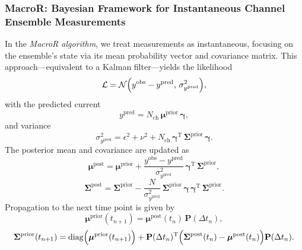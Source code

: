 \documentclass[pdflatex,sn-nature]{sn-jnl}%
\begin{document}
\subsubsection{MacroR: Bayesian Framework for Instantaneous Channel Ensemble Measurements}

In the \textit{MacroR algorithm}, we treat measurements as instantaneous, focusing on the ensemble's state via its mean probability vector and covariance matrix. This approach—equivalent to a Kalman filter\cite{stepanyuk2011efficient}—yields the likelihood
\begin{equation}
\mathcal{L} = \mathcal{N}\Bigl( y^{\text{obs}} - y^{\text{pred}},\, \sigma^2_{y^{\text{pred}}} \Bigr),
\label{eq:macro_likelihood}
\end{equation}
with the predicted current
	\begin{equation}
	y^{\text{pred}} = N_{\text{ch}}\, \boldsymbol{\mu}^{\text{prior}}\, \boldsymbol{\gamma},
\label{eq:macro_predicted_y}
\end{equation}
and variance
\begin{equation}
\sigma^2_{y^{\text{pred}}} = \epsilon^2 + \nu^2+ N_{\text{ch}}\, \boldsymbol{\gamma}^{\mathrm{T}}\, \boldsymbol{\Sigma}^{\text{prior}}\, \boldsymbol{\gamma}.
	\label{eq:macro_sigma_pred}
	\end{equation}
The posterior mean and covariance are updated as
\begin{equation}
\boldsymbol{\mu}^{\text{post}} = \boldsymbol{\mu}^{\text{prior}} + \frac{y^{\text{obs}} - y^{\text{pred}}}{\sigma^2_{y^{\text{pred}}}}\, \boldsymbol{\gamma}^{\mathrm{T}}\, \boldsymbol{\Sigma}^{\text{prior}},
\label{eq:macro_mean_posterior}
\end{equation}
	\begin{equation}
	\boldsymbol{\Sigma}^{\text{post}} = \boldsymbol{\Sigma}^{\text{prior}} - \frac{N}{\sigma^2_{y^{\text{pred}}}}\, \boldsymbol{\Sigma}^{\text{prior}}\, \boldsymbol{\gamma}\, \boldsymbol{\gamma}^{\mathrm{T}}\, \boldsymbol{\Sigma}^{\text{prior}}.
\label{eq:macro_cov_posterior}
\end{equation}
Propagation to the next time point is given by
\begin{equation}
\boldsymbol{\mu}^{\text{prior}}(t_{n+1}) = \boldsymbol{\mu}^{\text{post}}(t_n)\, \mathbf{P}(\Delta t_n),
	\label{eq:macro_mean_next_prior}
	\end{equation}
\begin{equation}
\boldsymbol{\Sigma}^{\text{prior}}(t_{n+1}) = \mathrm{diag}\Bigl(\boldsymbol{\mu}^{\text{prior}}(t_{n+1})\Bigr) + \mathbf{P}(\Delta t_n)^{\mathrm{T}} \Bigl( \boldsymbol{\Sigma}^{\text{post}}(t_n) - \boldsymbol{\mu}^{\text{post}}(t_n) \Bigr) \mathbf{P}(\Delta t_n).
\label{eq:macro_mean_next_cov}
\end{equation}
\end{document}
